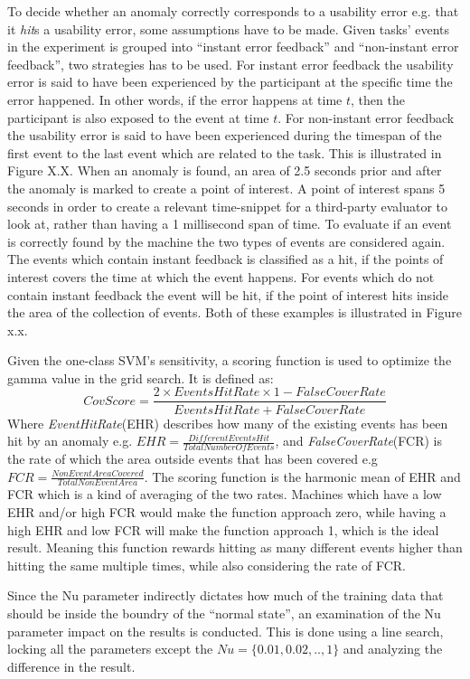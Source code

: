 To decide whether an anomaly correctly corresponds to a usability error e.g. that it \textit{hit}s a usability error, some assumptions have to be made. 
Given tasks' events in the experiment is grouped into ``instant error feedback'' and ``non-instant error feedback'', two strategies has to be used. 
For instant error feedback the usability error is said to have been experienced by the participant at the specific time the error happened. In other words, if the error happens at time $t$, then the participant is also exposed to the event at time $t$.
For non-instant error feedback the usability error is said to have been experienced during the timespan of the first event to the last event which are related to the task. This is illustrated in Figure X.X. 
When an anomaly is found, an area of 2.5 seconds prior and after the anomaly is marked to create a point of interest. 
A point of interest spans 5 seconds in order to create a relevant time-snippet for a third-party evaluator to look at, rather than having a 1 millisecond span of time.
To evaluate if an event is correctly found by the machine the two types of events are considered again.
The events which contain instant feedback is classified as a hit, if the points of interest covers the time at which the event happens.
For events which do not contain instant feedback the event will be hit, if the point of interest hits inside the area of the collection of events. Both of these examples is illustrated in Figure x.x. 

Given the one-class SVM's sensitivity, a scoring function is used to optimize the gamma value in the grid search. It is defined as: 
\[CovScore = \frac{2 \times EventsHitRate \times 1-FalseCoverRate}{EventsHitRate + FalseCoverRate}\]
Where \textit{EventHitRate}(EHR) describes how many of the existing events has been hit by an anomaly e.g. $EHR = \frac{DifferentEventsHit}{TotalNumberOfEvents}$, and \textit{FalseCoverRate}(FCR) is the rate of which the area outside events that has been covered e.g $FCR = \frac{NonEventAreaCovered}{TotalNonEventArea}$. 
The scoring function is the harmonic mean of EHR and FCR which is a kind of averaging of the two rates.
Machines which have a low EHR and/or high FCR would make the function approach zero, while having a high EHR and low FCR will make the function approach 1, which is the ideal result.
Meaning this function rewards hitting as many different events higher than hitting the same multiple times, while also considering the rate of FCR.

Since the Nu parameter indirectly dictates how much of the training data that should be inside the boundry of the ``normal state'', an examination of the Nu parameter impact on the results is conducted.
This is done using a line search, locking all the parameters except the $Nu = \{0.01, 0.02,.., 1\}$ and analyzing the difference in the result. 
